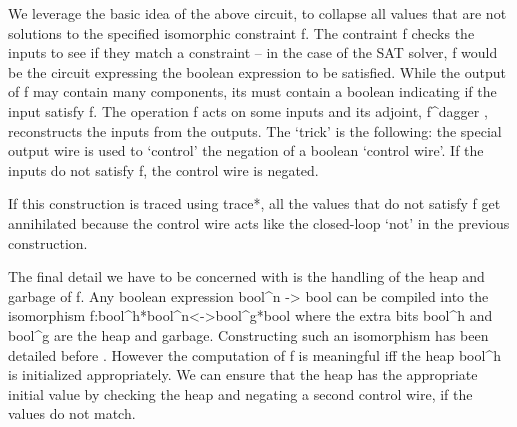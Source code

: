 \documentclass[preprint]{sigplanconf}
\begin{document}
We leverage the basic idea of the above circuit, to collapse all
values that are not solutions to the specified isomorphic constraint
{{f}}. The contraint {{f}} checks the inputs to see if they match a
constraint -- in the case of the SAT solver, {{f}} would be the
circuit expressing the boolean expression to be satisfied.  While the
output of {{f}} may contain many components, its must contain a
boolean indicating if the input satisfy {{f}}. The operation {{f}}
acts on some inputs and its adjoint, {{f^{dagger} }}, reconstructs the
inputs from the outputs.  The `trick' is the following: the special
output wire is used to `control' the negation of a boolean `control
wire'.  If the inputs do not satisfy {{f}}, the control wire is
negated.

\begin{center}
\end{center}  

If this construction is traced using {{trace*}}, all the values that
do not satisfy {{f}} get annihilated because the control wire acts
like the closed-loop `not' in the previous construction. 

The final detail we have to be concerned with is the handling of the
heap and garbage of {{f}}. Any boolean expression {{bool^n -> bool}}
can be compiled into the isomorphism {{f:bool^h*bool^n<->bool^g*bool}}
where the extra bits {{bool^h}} and {{bool^g}} are the heap and
garbage. Constructing such an isomorphism has been detailed before
\cite{Toffoli:1980,infeffects}.  However the computation of {{f}} is
meaningful {{iff}} the heap {{bool^h}} is initialized appropriately. We
can ensure that the heap has the appropriate initial value by checking
the heap and negating a second control wire, if the values do not
match.

\begin{center}
\end{center}  
\end{document}
